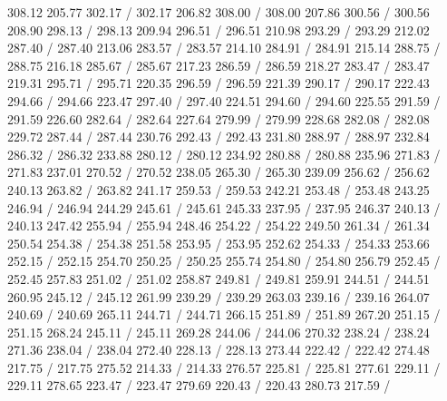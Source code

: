 { 308.12 205.77 302.17 /
 302.17 206.82 308.00 /
 308.00 207.86 300.56 /
 300.56 208.90 298.13 /
 298.13 209.94 296.51 /
 296.51 210.98 293.29 /
 293.29 212.02 287.40 /
 287.40 213.06 283.57 /
 283.57 214.10 284.91 /
 284.91 215.14 288.75 /
 288.75 216.18 285.67 /
 285.67 217.23 286.59 /
 286.59 218.27 283.47 /
 283.47 219.31 295.71 /
 295.71 220.35 296.59 /
 296.59 221.39 290.17 /
 290.17 222.43 294.66 /
 294.66 223.47 297.40 /
 297.40 224.51 294.60 /
 294.60 225.55 291.59 /
 291.59 226.60 282.64 /
 282.64 227.64 279.99 /
 279.99 228.68 282.08 /
 282.08 229.72 287.44 /
 287.44 230.76 292.43 /
 292.43 231.80 288.97 /
 288.97 232.84 286.32 /
 286.32 233.88 280.12 /
 280.12 234.92 280.88 /
 280.88 235.96 271.83 /
 271.83 237.01 270.52 /
 270.52 238.05 265.30 /
 265.30 239.09 256.62 /
 256.62 240.13 263.82 /
 263.82 241.17 259.53 /
 259.53 242.21 253.48 /
 253.48 243.25 246.94 /
 246.94 244.29 245.61 /
 245.61 245.33 237.95 /
 237.95 246.37 240.13 /
 240.13 247.42 255.94 /
 255.94 248.46 254.22 /
 254.22 249.50 261.34 /
 261.34 250.54 254.38 /
 254.38 251.58 253.95 /
 253.95 252.62 254.33 /
 254.33 253.66 252.15 /
 252.15 254.70 250.25 /
 250.25 255.74 254.80 /
 254.80 256.79 252.45 /
 252.45 257.83 251.02 /
 251.02 258.87 249.81 /
 249.81 259.91 244.51 /
 244.51 260.95 245.12 /
 245.12 261.99 239.29 /
 239.29 263.03 239.16 /
 239.16 264.07 240.69 /
 240.69 265.11 244.71 /
 244.71 266.15 251.89 /
 251.89 267.20 251.15 /
 251.15 268.24 245.11 /
 245.11 269.28 244.06 /
 244.06 270.32 238.24 /
 238.24 271.36 238.04 /
 238.04 272.40 228.13 /
 228.13 273.44 222.42 /
 222.42 274.48 217.75 /
 217.75 275.52 214.33 /
 214.33 276.57 225.81 /
 225.81 277.61 229.11 /
 229.11 278.65 223.47 /
 223.47 279.69 220.43 /
 220.43 280.73 217.59 /
}
